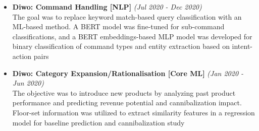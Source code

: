\documentclass[a4paper,10pt]{article}
\newcommand{\isep}{-2 pt}
\begin{document}
\begin{itemize}
\item \textbf{Diwo: Command Handling  [NLP]}  \hfill {\emph{(Jul 2020 - Dec 2020)}}\\
The goal was to replace keyword match-based query classification with an ML-based method. A BERT model was fine-tuned for sub-command classifications, and a BERT embeddings-based MLP model was developed for binary classification of command types and entity extraction based on intent-action pairs
\\ [-0.5cm]


\item \textbf{Diwo: Category Expansion/Rationalisation  [Core ML]} \hfill {\emph{(Jan 2020 - Jun 2020)}} \\
The objective was to introduce new products by analyzing past product performance and predicting revenue potential and cannibalization impact. Floor-set information was utilized to extract similarity features in a regression model for baseline prediction and cannibalization study 
\\ [-0.5cm]


\end{itemize}
\end{document}
